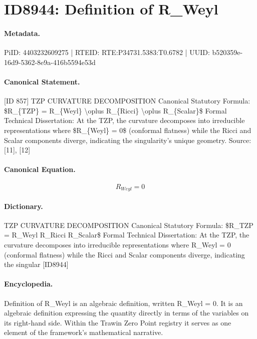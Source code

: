 \section*{ID8944: Definition of R\_Weyl}
\paragraph{Metadata.}
PiID: 4403232609275 | RTEID: RTE:P34731.5383:T0.6782 | UUID: b520359e-16d9-5362-8e9a-416b5594e53d

\paragraph{Canonical Statement.}
[ID 857] TZP CURVATURE DECOMPOSITION Canonical Statutory Formula: \$R\_\{TZP\} = R\_\{Weyl\} \textbackslash{}oplus R\_\{Ricci\} \textbackslash{}oplus R\_\{Scalar\}\$ Formal Technical Dissertation: At the TZP, the curvature decomposes into irreducible representations where \$R\_\{Weyl\} = 0\$ (conformal flatness) while the Ricci and Scalar components diverge, indicating the singularity's unique geometry. Source: [11], [12]

\paragraph{Canonical Equation.}
\[
R_{Weyl} = 0
\]

\paragraph{Dictionary.}
TZP CURVATURE DECOMPOSITION Canonical Statutory Formula: \$R\_TZP = R\_Weyl R\_Ricci R\_Scalar\$ Formal Technical Dissertation: At the TZP, the curvature decomposes into irreducible representations where R\_Weyl = 0 (conformal flatness) while the Ricci and Scalar components diverge, indicating the singular [ID8944]

\paragraph{Encyclopedia.}
Definition of R\_Weyl is an algebraic definition, written R\_Weyl = 0. It is an algebraic definition expressing the quantity directly in terms of the variables on its right-hand side. Within the Trawin Zero Point registry it serves as one element of the framework's mathematical narrative.
